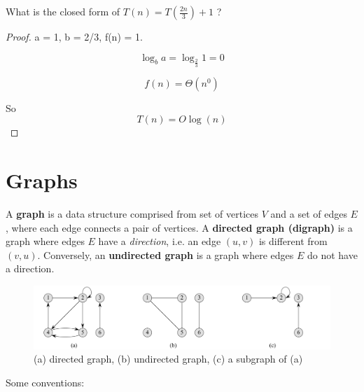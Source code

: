 \documentclass[../notes.tex]{subfiles}
\begin{document}
\begin{example}

	What is the closed form of $T(n) = T(\frac{2n}{3}) + 1$ ?

	\begin{proof}
		a = 1, b = 2/3, f(n) = 1.

		\begin{equation}
			\log_ba = \log_{\frac{2}{3}} 1 = 0 
		\end{equation}

		\begin{equation}
			f(n) = \Theta(n^0)
		\end{equation}

		So
		\begin{equation}
			T(n) = O\log(n)
		\end{equation}
		
	\end{proof}
	


	
\end{example}








\section{Graphs}


\begin{definition}
A \textbf{graph} is a data structure comprised from set of vertices $ V $ and a set of edges $ E $, where each edge connects a pair of vertices.
A \textbf{directed graph (digraph)} is a graph where edges $ E $ have a \textit{direction}, i.e. an edge $ (u,v) $ is different from $ (v,u) $.
Conversely, an \textbf{undirected graph} is a graph where edges $ E $ do not have a direction.
\begin{figure}[H]
	\centering
	\includegraphics[width=0.8\linewidth]{img/image_2022-09-22-00-05-04.png}
	\caption{(a) directed graph, (b) undirected graph, (c) a subgraph of (a)}
\end{figure}

\end{definition}

Some conventions:
\end{document}

